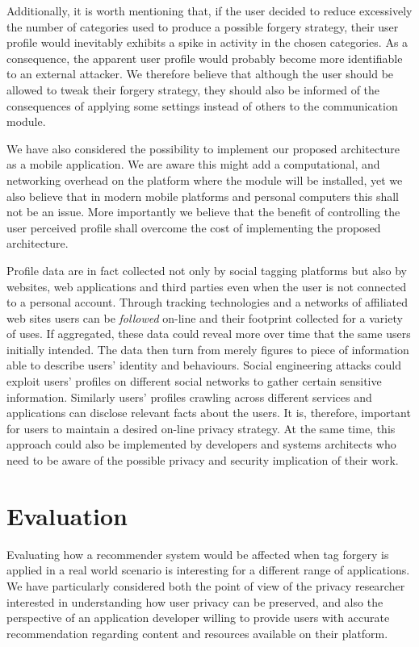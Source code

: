 Additionally, it is worth mentioning that, if the user decided to reduce excessively the number of categories used to produce a possible forgery strategy, their user profile would inevitably exhibits a spike in activity in the chosen categories. As a consequence, the apparent user profile would probably become more identifiable to an external attacker. We therefore believe that although the user should be allowed to tweak their forgery strategy, they should also be informed of the consequences of applying some settings instead of others to the communication module.

We have also considered the possibility to implement our proposed architecture as a mobile application. We are aware this might add a computational, and networking overhead on the platform where the module will be installed, yet we also believe that in modern mobile platforms and personal computers this shall not be an issue. More importantly we believe that the benefit of controlling the user perceived profile shall overcome the cost of implementing the proposed architecture.

Profile data are in fact collected not only by social tagging platforms but also by websites, web applications and third parties even when the user is not connected to a personal account. Through tracking technologies and a networks of affiliated web sites users can be \emph{followed} on-line and their footprint collected for a variety of uses.
If aggregated, these data could reveal more over time that the same users initially intended. The data then turn from merely figures to piece of information able to describe users' identity and behaviours. Social engineering attacks could exploit users' profiles on different social networks to gather certain sensitive information. Similarly users' profiles crawling across different services and applications can disclose relevant facts about the users. It is, therefore, important for users to maintain a desired on-line privacy strategy. At the same time, this approach could also be implemented by developers and systems architects who need to be aware of the possible privacy and security implication of their work.

\section{Evaluation}
\label{sec:evaluation}
Evaluating how a recommender system would be affected when tag forgery is applied in a real world scenario is interesting for a different range of applications. We have particularly considered both the point of view of the privacy researcher interested in understanding how user privacy can be preserved, and also the perspective of an application developer willing to provide users with accurate recommendation regarding content and resources available on their platform.

